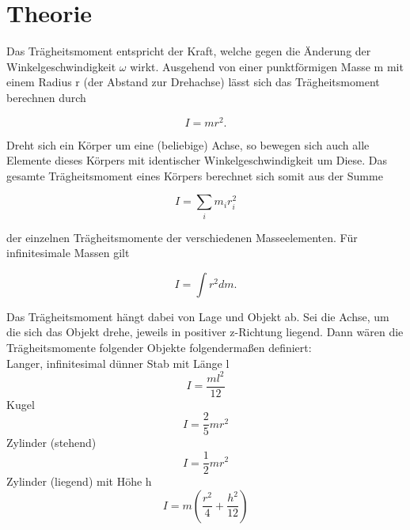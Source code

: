 \section{Theorie}
\label{sec:Theorie}

Das Trägheitsmoment entspricht der Kraft, welche gegen die Änderung der
Winkelgeschwindigkeit $\omega$ wirkt. Ausgehend von einer punktförmigen 
Masse m mit einem Radius r (der Abstand zur Drehachse) lässt sich das 
Trägheitsmoment berechnen durch

\begin{equation}
    I = m r^2 .
\end{equation}

Dreht sich ein Körper um eine (beliebige) Achse, so bewegen sich auch alle
Elemente dieses Körpers mit identischer Winkelgeschwindigkeit um Diese. Das
gesamte Trägheitsmoment eines Körpers berechnet sich somit aus der Summe

\begin{equation}
    I = \sum\limits_{i} m_i r_i^2
\end{equation}

der einzelnen Trägheitsmomente der verschiedenen Masseelementen. Für
infinitesimale Massen gilt

\begin{equation}
    I = \int r^2 dm .
\end{equation}

Das Trägheitsmoment hängt dabei von Lage und Objekt ab. Sei die
Achse, um die sich das Objekt drehe, jeweils in positiver z-Richtung liegend.
Dann wären die Trägheitsmomente folgender Objekte folgendermaßen definiert:\\
Langer, infinitesimal dünner Stab mit Länge l
\begin{equation}
    I = \frac{ml^2}{12}
\end{equation}
Kugel
\begin{equation}
    I = \frac{2}{5} m r^2
\end{equation}
Zylinder (stehend)
\begin{equation}
    I = \frac{1}{2} m r^2
\end{equation}
Zylinder (liegend) mit Höhe h
\begin{equation}
    I = m \left(\frac{r^2}{4} + \frac{h^2}{12} \right) 
\end{equation}

\cite{sample}
